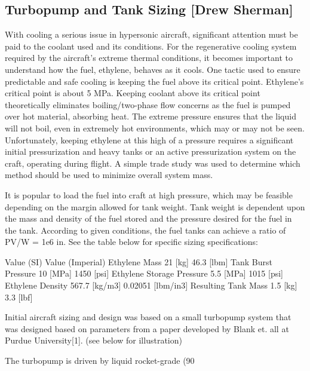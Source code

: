 \subsection{Turbopump and Tank Sizing [Drew Sherman]}
With cooling a serious issue in hypersonic aircraft, significant attention must be paid to the coolant used and its conditions. For the regenerative cooling system required by the aircraft’s extreme thermal conditions, it becomes important to understand how the fuel, ethylene, behaves as it cools. One tactic used to ensure predictable and safe cooling is keeping the fuel above its critical point. Ethylene’s critical point is about 5 MPa. Keeping coolant above its critical point theoretically eliminates boiling/two-phase flow concerns as the fuel is pumped over hot material, absorbing heat. The extreme pressure ensures that the liquid will not boil, even in extremely hot environments, which may or may not be seen. Unfortunately, keeping ethylene at this high of a pressure requires a significant initial pressurization and heavy tanks or an active pressurization system on the craft, operating during flight. A simple trade study was used to determine which method should be used to minimize overall system mass. 

It is popular to load the fuel into craft at high pressure, which may be feasible depending on the margin allowed for tank weight. Tank weight is dependent upon the mass and density of the fuel stored and the pressure desired for the fuel in the tank. According to given conditions, the fuel tanks can achieve a ratio of PV/W = 1e6 in. See the table below for specific sizing specifications: 



Value (SI)
Value (Imperial)
Ethylene Mass
21 [kg]
46.3 [lbm]
Tank Burst Pressure
10 [MPa]
1450 [psi]
Ethylene Storage Pressure
5.5 [MPa]
1015 [psi]
Ethylene Density
567.7 [kg/m3]
0.02051 [lbm/in3]
Resulting Tank Mass
1.5 [kg]
3.3 [lbf]
 
Initial aircraft sizing and design was based on a small turbopump system that was designed based on parameters from a paper developed by Blank et. all at Purdue University[1]. (see below for illustration)



The turbopump is driven by liquid rocket-grade (90%

